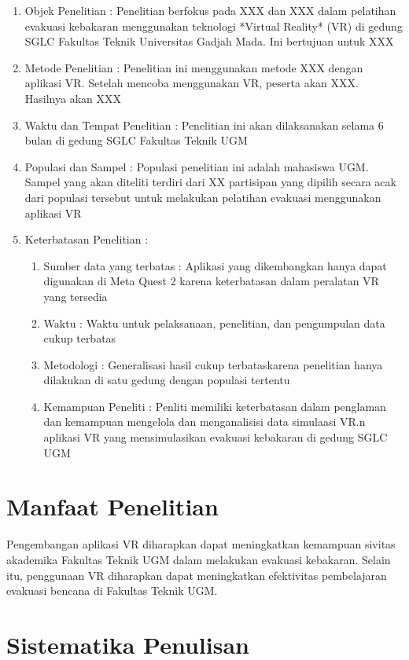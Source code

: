 \begin{enumerate}
	\item Objek Penelitian : Penelitian berfokus pada XXX dan XXX dalam pelatihan evakuasi kebakaran menggunakan teknologi *Virtual Reality* (VR) di gedung SGLC Fakultas Teknik Universitas Gadjah Mada. Ini bertujuan untuk XXX
	\item 	Metode Penelitian : Penelitian ini menggunakan metode XXX dengan aplikasi VR. Setelah mencoba menggunakan VR, peserta akan XXX. Hasilnya akan XXX
	\item Waktu dan Tempat Penelitian : Penelitian ini akan dilaksanakan selama 6 bulan di gedung SGLC Fakultas Teknik UGM
	\item Populasi dan Sampel : Populasi penelitian ini adalah mahasiswa UGM. Sampel yang akan diteliti terdiri dari XX partisipan yang dipilih secara acak dari populasi tersebut untuk melakukan pelatihan evakuasi menggunakan aplikasi VR
	\item Keterbatasan Penelitian :
	\begin{enumerate}
		\item Sumber data yang terbatas : Aplikasi yang dikembangkan hanya dapat digunakan di Meta Quest 2 karena keterbatasan dalam peralatan VR yang tersedia
		\item Waktu : Waktu untuk pelaksanaan, penelitian, dan pengumpulan data cukup terbatas
		\item Metodologi : Generalisasi hasil cukup terbataskarena penelitian hanya dilakukan di satu gedung dengan populasi tertentu
		\item Kemampuan Peneliti : Penliti memiliki keterbatasan dalam penglaman dan kemampuan mengelola dan menganalisisi data simulaasi VR.n aplikasi VR yang mensimulasikan evakuasi kebakaran di gedung SGLC UGM

	\end{enumerate}
   
	
\end{enumerate}

\section{Manfaat Penelitian}

Pengembangan aplikasi VR diharapkan dapat meningkatkan kemampuan sivitas akademika Fakultas Teknik UGM dalam melakukan evakuasi kebakaran. Selain itu, penggunaan VR diharapkan dapat meningkatkan efektivitas pembelajaran evakuasi bencana di Fakultas Teknik UGM.


\section{Sistematika Penulisan}

